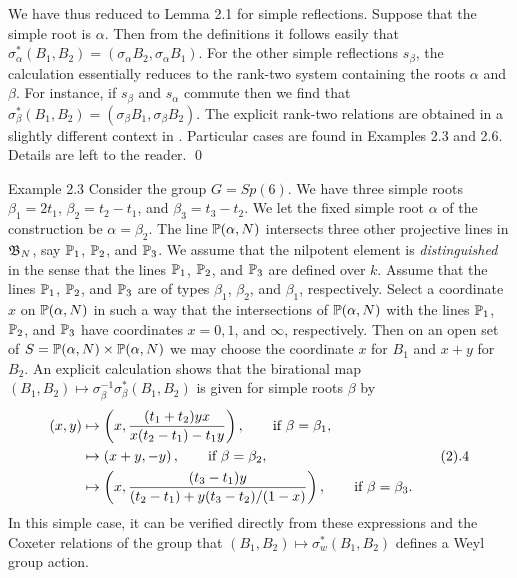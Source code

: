 We have thus reduced to Lemma 2.1 for simple reflections.
Suppose that the simple root is $\alpha$.  Then from the definitions it follows
easily that $\sigma^*_\alpha (B_1,B_2) = (\sigma_\alpha B_2,
\sigma_\alpha B_1)$.  For the other
simple reflections $s_\beta$, the calculation essentially reduces to the
rank-two system containing the roots $\alpha$ and $\beta$.  For instance,
if $s_\beta$ and $s_\alpha$ commute then we find that 
$\sigma^*_\beta (B_1,B_2) = (\sigma_\beta B_1,
\sigma_\beta B_2)$.  
The explicit rank-two relations are obtained
in a slightly different
context in \cite{H3,VI.1.6}.
Particular cases are found in Examples 2.3 and 2.6.
Details are left to the reader.
\qed\enddemo

\subhead Example 2.3\endsubhead
  Consider the group $G=Sp(6)$.  We have three
simple roots $\beta_1 = 2t_1$,
$\beta_2 = t_2-t_1$, and $\beta_3 = t_3-t_2$.  We let the fixed simple
root $\alpha$ of the construction be $\alpha=\beta_2$.  
The line
$\P(\alpha,N)$ intersects three other projective lines in $\B_N$, say
$\P_1$, $\P_2$, and $\P_3$.  We assume that the nilpotent element
is {\it distinguished} in the sense that the lines $\P_1$, $\P_2$, and
$\P_3$ are defined over $k$.  Assume that the lines $\P_1$, $\P_2$, and
$\P_3$ are of types $\beta_1$, $\beta_2$, and $\beta_1$, respectively.
Select a coordinate $x$ on $\P(\alpha,N)$ 
in such a way that the intersections
of $\P(\alpha,N)$ with the lines $\P_1$, $\P_2$, and $\P_3$ have
coordinates $x=0,1$, and $\infty$, respectively.  Then on an open set of $S =
\P(\alpha,N)\times \P(\alpha,N)$ we may choose the coordinate $x$
for $B_1$ and $x+y$ for $B_2$.  An explicit calculation shows that
the birational map $(B_1,B_2)\mapsto \sigma_\beta^{-1}\sigma^*_\beta(B_1,B_2)$
is given for simple roots $\beta$ by
$$
\aligned
(x,y) &\mapsto \left(x, {(t_1+t_2) y x\over  x (t_2-t_1) -  t_1 y}\right),
    \qquad \hbox{if } \beta=\beta_1,\\
      &\mapsto \left(x+y,-y\right),\qquad \hbox{if } \beta=\beta_2,\\
      &\mapsto \left(x,{(t_3-t_1)y\over (t_2-t_1) + y (t_3-t_2)/(1-x)}\right),
      \qquad \hbox{if } \beta=\beta_3.
\endaligned\tag 2.4
$$
In this simple case, it can be verified directly from these expressions
and the Coxeter relations of the group
that $(B_1,B_2)\mapsto \sigma^*_w(B_1,B_2)$ defines a Weyl group action.

